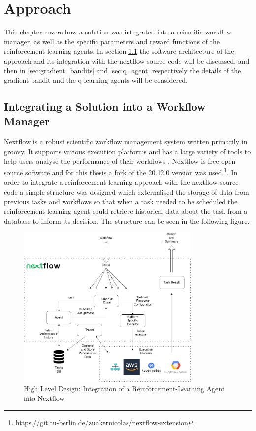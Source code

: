
\cleardoublepage
\chapter{Approach}
\label{cha:approach}


This chapter covers how a solution was integrated into a scientific workflow manager, as well as the specific parameters and reward functions of the reinforcement learning agents. In section \ref{sec:integration} the software architecture of the approach and its integration with the nextflow source code will be discussed, and then in \ref{sec:gradient_bandits} and \ref{sec:q_agent} respectively the details of the gradient bandit and the q-learning agents will be considered. 

\section{Integrating a Solution into a Workflow Manager}
\label{sec:integration}

Nextflow is a robust scientific  workflow management system written primarily in groovy. It supports various execution platforms and has a large variety of tools to help users analyse the performance of their workflows \cite{TracingAndVisualisation}. Nextflow is free open source software and for this thesis a fork of the 20.12.0 version was used \footnote{https://git.tu-berlin.de/zunkernicolas/nextflow-extension}. In order to integrate a reinforcement learning approach with the nextflow source code a simple structure was designed which externalised the storage of data from previous tasks and workflows so that when a task needed to be scheduled the reinforcement learning agent could retrieve historical data about the task from a database to inform its decision. The structure can be seen in the following figure.

\begin{figure}[ht]
    \centering
        \includegraphics[width=0.8\textwidth]{fig/implementation_diagram.png}
        \caption{High Level Design: Integration of a Reinforcement-Learning Agent into Nextflow}
        \label{fig:implementation}
\end{figure}

